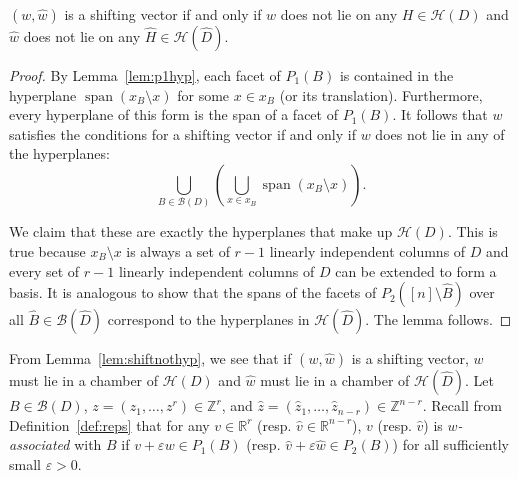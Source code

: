 \documentclass[ALCO,ThmDefs,Unicode,epreuves]{cedram}
\renewcommand{\epsilon}{\varepsilon}
\newcommand{\R}{\mathbb{R}}
\newcommand{\Z}{\mathbb{Z}}
\newcommand{\B}{\mathcal{B}}
\newcommand{\CB}{x_B}
\DeclareMathOperator{\spn}{span}
\begin{document}
\begin{lemma}\label{lem:shiftnothyp}
$(w,\widehat w)$ is a shifting vector if and only if $w$ does not lie on any $H \in \mathcal H(D)$ and $\widehat w$ does not lie on any $\widehat H \in \mathcal H(\widehat D)$. 
\end{lemma}
\begin{proof}
By Lemma~\ref{lem:p1hyp}, each facet of $P_1(B)$ is contained in the hyperplane $\spn(\CB \setminus x)$ for some $x \in \CB$ (or its translation). Furthermore, every hyperplane of this form is the span of a facet of $P_1(B)$. It follows that $w$ satisfies the conditions for a shifting vector if and only if $w$ does not lie in any of the hyperplanes:
\[
\bigcup_{B \in \B(D)}\left (\bigcup_{x \in \CB} \spn(\CB \setminus x)\right).
\]

We claim that these are exactly the hyperplanes that make up $\mathcal H(D)$. This is true because $\CB \setminus x$ is always a set of $r-1$ linearly independent columns of $D$ and every set of $r-1$ linearly independent columns of $D$ can be extended to form a basis. It is analogous to show that the spans of the facets of $P_2([n] \setminus \widehat B)$ over all $\widehat B \in \B(\widehat D)$ correspond to the hyperplanes in $\mathcal H(\widehat D)$. The lemma follows. 
\end{proof}

From Lemma~\ref{lem:shiftnothyp}, we see that if $(w,\widehat w)$ is a shifting vector, $w$ must lie in a chamber of $\mathcal H(D)$ and $\widehat w$ must lie in a chamber of $\mathcal H(\widehat D)$. Let $B \in \B(D)$, $z = (z_1,\dots,z^r) \in \Z^r$, and $\widehat z = (\widehat z_1,\dots, \widehat z_{n-r})\in \Z^{n-r}$. Recall from Definition~\ref{def:reps} that for any $v \in \R^r$ (resp. $\widehat v \in \R^{n-r}$), $v$ (resp. $\widehat v$) is \emph{$w$-associated} with $B$ if $v+ \epsilon w \in P_1(B)$ (resp. $\widehat v + \epsilon \widehat w \in P_2(B)$) for all sufficiently small $\epsilon>0$.
\end{document}
